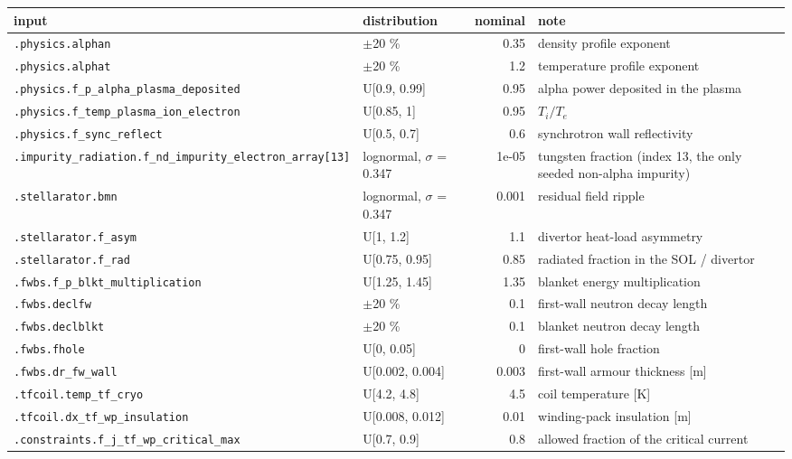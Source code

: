 \begin{tabular}{llrl}
\toprule
input & distribution & nominal & note \\
\midrule
\texttt{.physics.alphan} & $\pm$20 \% & 0.35 & density profile exponent \\
\texttt{.physics.alphat} & $\pm$20 \% & 1.2 & temperature profile exponent \\
\texttt{.physics.f\_p\_alpha\_plasma\_deposited} & U[0.9, 0.99] & 0.95 & alpha power deposited in the plasma \\
\texttt{.physics.f\_temp\_plasma\_ion\_electron} & U[0.85, 1] & 0.95 & $T_i / T_e$ \\
\texttt{.physics.f\_sync\_reflect} & U[0.5, 0.7] & 0.6 & synchrotron wall reflectivity \\
\texttt{.impurity\_radiation.f\_nd\_impurity\_electron\_array[13]} & lognormal, $\sigma$ = 0.347 & 1e-05 & tungsten fraction (index 13, the only seeded non-alpha impurity) \\
\texttt{.stellarator.bmn} & lognormal, $\sigma$ = 0.347 & 0.001 & residual field ripple \\
\texttt{.stellarator.f\_asym} & U[1, 1.2] & 1.1 & divertor heat-load asymmetry \\
\texttt{.stellarator.f\_rad} & U[0.75, 0.95] & 0.85 & radiated fraction in the SOL / divertor \\
\texttt{.fwbs.f\_p\_blkt\_multiplication} & U[1.25, 1.45] & 1.35 & blanket energy multiplication \\
\texttt{.fwbs.declfw} & $\pm$20 \% & 0.1 & first-wall neutron decay length \\
\texttt{.fwbs.declblkt} & $\pm$20 \% & 0.1 & blanket neutron decay length \\
\texttt{.fwbs.fhole} & U[0, 0.05] & 0 & first-wall hole fraction \\
\texttt{.fwbs.dr\_fw\_wall} & U[0.002, 0.004] & 0.003 & first-wall armour thickness [m] \\
\texttt{.tfcoil.temp\_tf\_cryo} & U[4.2, 4.8] & 4.5 & coil temperature [K] \\
\texttt{.tfcoil.dx\_tf\_wp\_insulation} & U[0.008, 0.012] & 0.01 & winding-pack insulation [m] \\
\texttt{.constraints.f\_j\_tf\_wp\_critical\_max} & U[0.7, 0.9] & 0.8 & allowed fraction of the critical current \\

\end{tabular}
